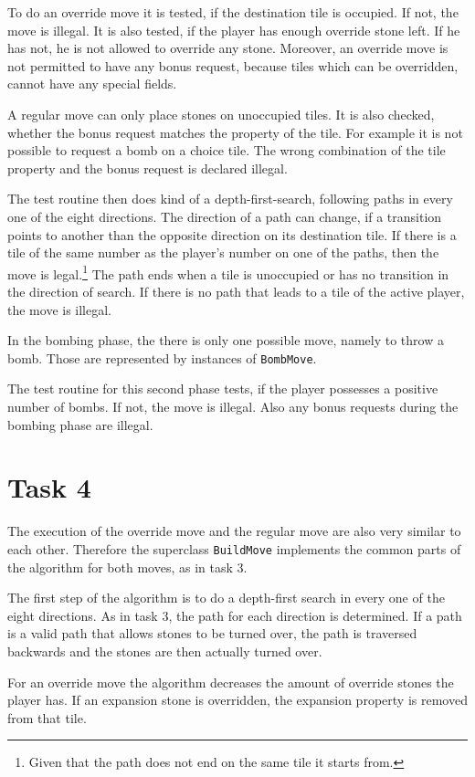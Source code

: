 \documentclass[a4paper,12pt]{article}
\begin{document}
To do an override move it is tested, if the destination tile is occupied. If not, the move is illegal. It is also tested, if the player has enough override stone left. If he has not, he is not allowed to override any stone. Moreover, an override move is not permitted to have any bonus request, because tiles which can be overridden, cannot have any special fields.

A regular move can only place stones on unoccupied tiles. It is also checked, whether the bonus request matches the property of the tile. For example it is not possible to request a bomb on a choice tile. The wrong combination of the tile property and the bonus request is declared illegal.

The test routine then does kind of a depth-first-search, following paths in every one of the eight directions. The direction of a path can change, if a transition points to another than the opposite direction on its destination tile. If there is a tile of the same number as the player's number on one of the paths, then the move is legal.\footnote{Given that the path does not end on the same tile it starts from.} The path ends when a tile is unoccupied or has no transition in the direction of search. If there is no path that leads to a tile of the active player, the move is illegal.

In the bombing phase, the  there is only one possible move, namely to throw a bomb. Those are represented by instances of \texttt{BombMove}.

The test routine for this second phase tests, if the player possesses a positive number of bombs. If not, the move is illegal. Also any bonus requests during the bombing phase are illegal. 

\section{Task 4}
The execution of the override move and the regular move are also very similar to each other. Therefore the superclass \texttt{BuildMove} implements the common parts of the algorithm for both moves, as in task 3.

The first step of the algorithm is to do a depth-first search in every one of the eight directions. As in task 3, the path for each direction is determined. If a path is a valid path that allows stones to be turned over, the path is traversed backwards and the stones are then actually turned over.

For an override move the algorithm decreases the amount of override stones the player has. If an expansion stone is overridden, the expansion property is removed from that tile.
\end{document}
